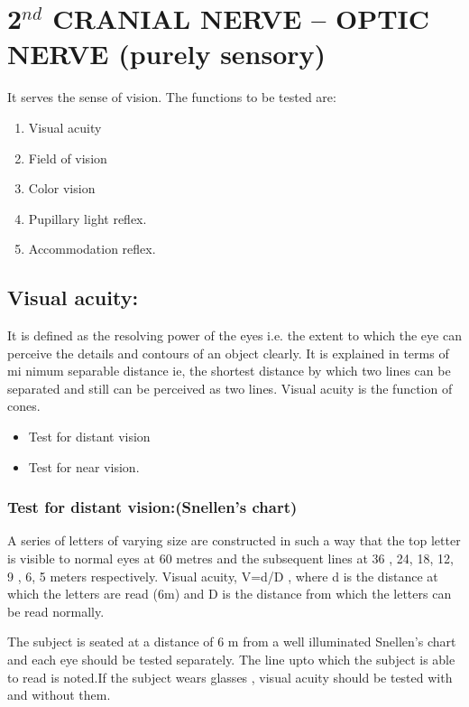 \documentclass[a4paper,12pt]{book}
\begin{document}
		\section*{2$^{nd}$ CRANIAL NERVE – OPTIC NERVE (purely sensory)}
		It serves the sense of vision. The functions to be tested are:
		\begin{enumerate}
\item{Visual acuity}
\item{Field of vision}
\item{Color vision}
\item{Pupillary light reflex.}
\item{Accommodation reflex.}
		\end{enumerate}
		\subsection*{Visual acuity:}
		It is defined as the resolving power of the eyes i.e. the extent to which the eye can perceive the details and contours of an object clearly. It is explained in terms of mi nimum separable distance ie, the shortest distance by which two lines can be separated and still can be perceived as two lines. Visual acuity is the function of cones.
		\begin{itemize}
			\item[]Test for distant vision
			\item[]Test for near vision.
		\end{itemize}
		\subsubsection*{Test for distant vision:(Snellen's chart)}
		A series of letters of varying size are constructed in such a way that the top letter is visible to normal eyes at 60 metres and the subsequent lines at 36 , 24, 18, 12, 9 , 6, 5 meters respectively. Visual acuity, V=d/D , where d is the distance at which the letters are read (6m) and D is the distance from which the letters can be read normally.
		\par
		The subject is seated at a distance of 6 m from a well illuminated Snellen's chart and each eye should be tested separately. The line upto which the subject is able to read is noted.If the subject wears glasses , visual acuity should be tested with and without them.
\end{document}
